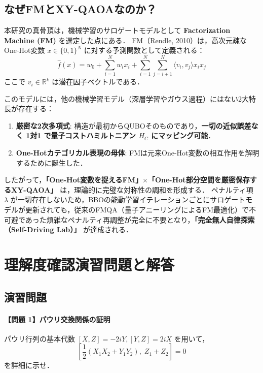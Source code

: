 \documentclass[11pt,a4paper,oneside,openany]{ltjsbook}
\theoremstyle{definition}
\theoremstyle{plain}
\theoremstyle{remark}
\begin{document}
\section{なぜFMとXY-QAOAなのか？}
本研究の真骨頂は，機械学習のサロゲートモデルとして \textbf{Factorization Machine (FM)} を選定した点にある．
FM（Rendle, 2010\cite{rendle2010factorization}）は，高次元疎なOne-Hot変数 $x \in \{0, 1\}^N$ に対する予測関数として定義される：
\begin{equation}
    \hat{f}(x) = w_0 + \sum_{i=1}^N w_i x_i + \sum_{i=1}^N \sum_{j=i+1}^N \langle v_i, v_j \rangle x_i x_j
\end{equation}
ここで $v_i \in \mathbb{R}^k$ は潜在因子ベクトルである．

このモデルには，他の機械学習モデル（深層学習やガウス過程）にはない2大特長が存在する：
\begin{enumerate}
    \item \textbf{厳密な2次多項式}: 構造が最初からQUBOそのものであり，\textbf{一切の近似誤差なく 1対1 で量子コストハミルトニアン $H_C$ にマッピング可能}．
    \item \textbf{One-Hotカテゴリカル表現の母体}: FMは元来One-Hot変数の相互作用を解明するために誕生した．
\end{enumerate}

したがって，\textbf{「One-Hot変数を捉えるFM」$\times$「One-Hot部分空間を厳密保存するXY-QAOA」} は，理論的に完璧な対称性の調和を形成する．
ペナルティ項 $\lambda$ が一切存在しないため，BBOの能動学習イテレーションごとにサロゲートモデルが更新されても，従来のFMQA（量子アニーリングによるFM最適化\cite{kitai2020designing}）で不可避であった煩雑なペナルティ再調整が完全に不要となり，\textbf{「完全無人自律探索（Self-Driving Lab）」} が達成される．

\chapter{理解度確認演習問題と解答}

\section{演習問題}

\subsubsection*{【問題 1】パウリ交換関係の証明}
パウリ行列の基本代数 $[X, Z] = -2iY, [Y, Z] = 2iX$ を用いて，
\begin{equation}
    \left[ \frac{1}{2}(X_1 X_2 + Y_1 Y_2), \; Z_1 + Z_2 \right] = 0
\end{equation}
を詳細に示せ．
\end{document}

